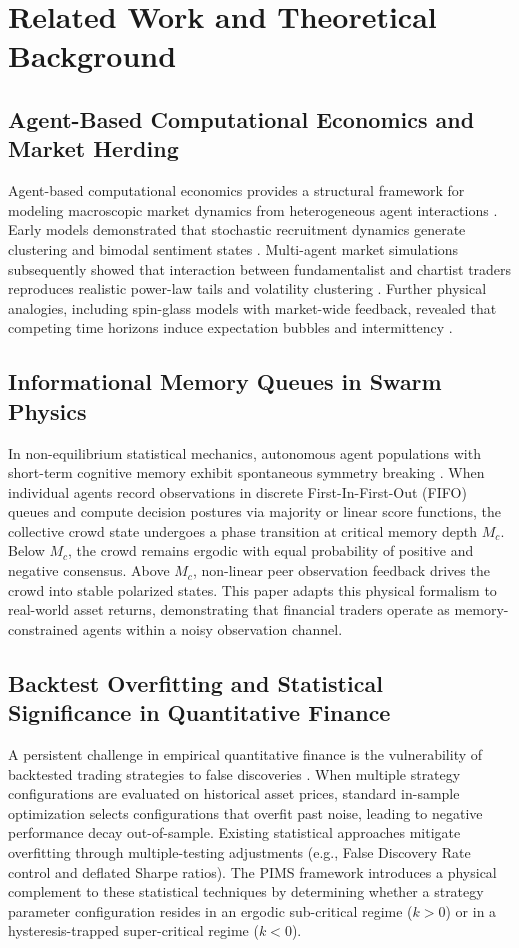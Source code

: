 \section{Related Work and Theoretical Background}

\subsection{Agent-Based Computational Economics and Market Herding}
Agent-based computational economics provides a structural framework for modeling macroscopic market dynamics from heterogeneous agent interactions \cite{bouchaud2013more, farmer2009economy}. Early models demonstrated that stochastic recruitment dynamics generate clustering and bimodal sentiment states \cite{kirman1993ants}. Multi-agent market simulations subsequently showed that interaction between fundamentalist and chartist traders reproduces realistic power-law tails and volatility clustering \cite{lux1999scaling, alfarano2005estimation}. Further physical analogies, including spin-glass models with market-wide feedback, revealed that competing time horizons induce expectation bubbles and intermittency \cite{bornholdt2001expectation}.

\subsection{Informational Memory Queues in Swarm Physics}
In non-equilibrium statistical mechanics, autonomous agent populations with short-term cognitive memory exhibit spontaneous symmetry breaking \cite{li2026informational}. When individual agents record observations in discrete First-In-First-Out (FIFO) queues and compute decision postures via majority or linear score functions, the collective crowd state undergoes a phase transition at critical memory depth $M_c$. Below $M_c$, the crowd remains ergodic with equal probability of positive and negative consensus. Above $M_c$, non-linear peer observation feedback drives the crowd into stable polarized states. This paper adapts this physical formalism to real-world asset returns, demonstrating that financial traders operate as memory-constrained agents within a noisy observation channel.

\subsection{Backtest Overfitting and Statistical Significance in Quantitative Finance}
A persistent challenge in empirical quantitative finance is the vulnerability of backtested trading strategies to false discoveries \cite{bailey2017probability}. When multiple strategy configurations are evaluated on historical asset prices, standard in-sample optimization selects configurations that overfit past noise, leading to negative performance decay out-of-sample. Existing statistical approaches mitigate overfitting through multiple-testing adjustments (e.g., False Discovery Rate control and deflated Sharpe ratios). The PIMS framework introduces a physical complement to these statistical techniques by determining whether a strategy parameter configuration resides in an ergodic sub-critical regime ($k > 0$) or in a hysteresis-trapped super-critical regime ($k < 0$).

